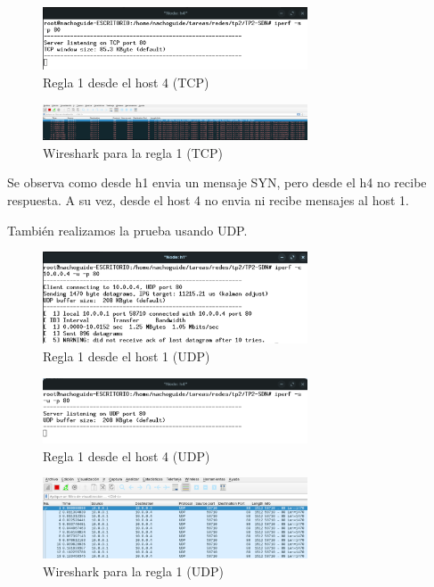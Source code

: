 \documentclass[titlepage,a4paper]{article}
\begin{document}
\begin{figure}[H]
    \centering
    \includegraphics[width=0.7\textwidth]{img/regla1_h4_tcp.png}
    \caption{Regla 1 desde el host 4 (TCP)}
\end{figure}

\begin{figure}[H]
    \centering
    \includegraphics[width=0.7\textwidth]{img/regla1_wireshark_tcp.png}
    \caption{Wireshark para la regla 1 (TCP)}
\end{figure}

Se observa como desde h1 envia un mensaje SYN, pero desde el h4 no recibe respuesta. A su vez, desde el host 4 no envia ni recibe mensajes al host 1.

También realizamos la prueba usando UDP.

\begin{figure}[H]
    \centering
    \includegraphics[width=0.7\textwidth]{img/regla1_h1_udp.png}
    \caption{Regla 1 desde el host 1 (UDP)}
\end{figure}

\begin{figure}[H]
    \centering
    \includegraphics[width=0.7\textwidth]{img/regla1_h4_udp.png}
    \caption{Regla 1 desde el host 4 (UDP)}
\end{figure}

\begin{figure}[H]
    \centering
    \includegraphics[width=0.7\textwidth]{img/regla1_wireshark_udp.png}
    \caption{Wireshark para la regla 1 (UDP)}
\end{figure}
\end{document}
